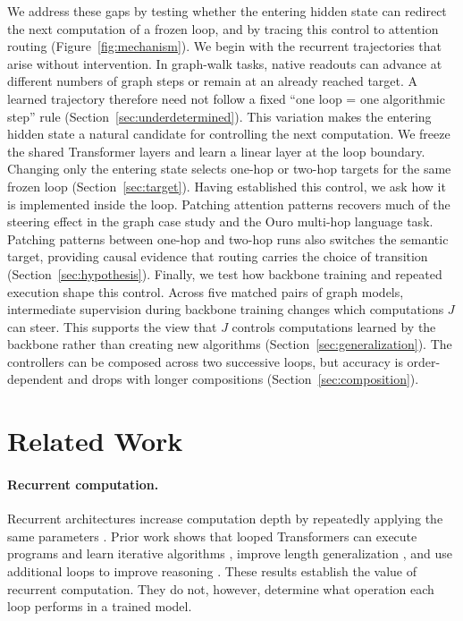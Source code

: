\documentclass{article}
\begin{document}
We address these gaps by testing whether the entering hidden state can redirect the next computation of a frozen loop, and by tracing this control to attention routing (Figure~\ref{fig:mechanism}).
We begin with the recurrent trajectories that arise without intervention.
In graph-walk tasks, native readouts can advance at different numbers of graph steps or remain at an already reached target.
A learned trajectory therefore need not follow a fixed ``one loop = one algorithmic step'' rule (Section~\ref{sec:underdetermined}).
This variation makes the entering hidden state a natural candidate for controlling the next computation.
We freeze the shared Transformer layers and learn a linear layer at the loop boundary.
Changing only the entering state selects one-hop or two-hop targets for the same frozen loop (Section~\ref{sec:target}).
Having established this control, we ask how it is implemented inside the loop.
Patching attention patterns recovers much of the steering effect in the graph case study and the Ouro multi-hop language task. Patching patterns between one-hop and two-hop runs also switches the semantic target, providing causal evidence that routing carries the choice of transition (Section~\ref{sec:hypothesis}).
Finally, we test how backbone training and repeated execution shape this control.
Across five matched pairs of graph models, intermediate supervision during backbone training changes which computations $J$ can steer. This supports the view that $J$ controls computations learned by the backbone rather than creating new algorithms (Section~\ref{sec:generalization}). The controllers can be composed across two successive loops, but accuracy is order-dependent and drops with longer compositions (Section~\ref{sec:composition}).

\section{Related Work}
\label{sec:related}

\paragraph{Recurrent computation.}
Recurrent architectures increase computation depth by repeatedly applying the same parameters \citep{dehghani2019universal}. Prior work shows that looped Transformers can execute programs and learn iterative algorithms \citep{giannou2023loops,yang2024learning,gatmiry2024gradient}, improve length generalization \citep{fan2025looped}, and use additional loops to improve reasoning \citep{saunshi2025looped,geiping2025scaling,zhu2025ouro}. These results establish the value of recurrent computation. They do not, however, determine what operation each loop performs in a trained model.
\end{document}
